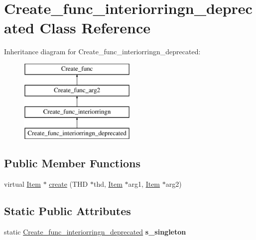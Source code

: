 \hypertarget{classCreate__func__interiorringn__deprecated}{}\section{Create\+\_\+func\+\_\+interiorringn\+\_\+deprecated Class Reference}
\label{classCreate__func__interiorringn__deprecated}
Inheritance diagram for Create\+\_\+func\+\_\+interiorringn\+\_\+deprecated\+:\begin{figure}[H]
\begin{center}
\leavevmode
\includegraphics[height=4.000000cm]{classCreate__func__interiorringn__deprecated}
\end{center}
\end{figure}
\subsection*{Public Member Functions}
\begin{DoxyCompactItemize}
\item 
virtual \mbox{\hyperlink{classItem}{Item}} $\ast$ \mbox{\hyperlink{classCreate__func__interiorringn__deprecated_a99eba9f8f6cad16f8a2050b0017c68b5}{create}} (T\+HD $\ast$thd, \mbox{\hyperlink{classItem}{Item}} $\ast$arg1, \mbox{\hyperlink{classItem}{Item}} $\ast$arg2)
\end{DoxyCompactItemize}
\subsection*{Static Public Attributes}
\begin{DoxyCompactItemize}
\item 
\mbox{\label{classCreate__func__interiorringn__deprecated_adc27a83794d4c8becbcc966fd9919355}} 
static \mbox{\hyperlink{classCreate__func__interiorringn__deprecated}{Create\+\_\+func\+\_\+interiorringn\+\_\+deprecated}} {\bfseries s\+\_\+singleton}
\end{DoxyCompactItemize}
